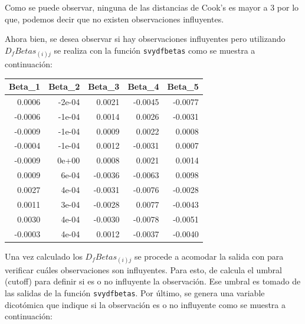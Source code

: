 \documentclass[
  spanish,
  12pt,
]{book}
\newenvironment{Shaded}{\begin{snugshade}}{\end{snugshade}}
\newcommand{\DataTypeTok}[1]{\textcolor[rgb]{0.13,0.29,0.53}{#1}}
\newcommand{\DecValTok}[1]{\textcolor[rgb]{0.00,0.00,0.81}{#1}}
\newcommand{\FunctionTok}[1]{\textcolor[rgb]{0.13,0.29,0.53}{\textbf{#1}}}
\newcommand{\NormalTok}[1]{#1}
\newcommand{\OtherTok}[1]{\textcolor[rgb]{0.56,0.35,0.01}{#1}}
\newcommand{\SpecialCharTok}[1]{\textcolor[rgb]{0.81,0.36,0.00}{\textbf{#1}}}
\newcommand{\StringTok}[1]{\textcolor[rgb]{0.31,0.60,0.02}{#1}}
\begin{document}
Como se puede observar, ninguna de las distancias de Cook's es mayor a 3 por lo que, podemos decir que no existen observaciones influyentes.

Ahora bien, se desea observar si hay observaciones influyentes pero utilizando \(D_{f}Betas_{\left(i\right)j}\) se realiza con la función \texttt{svydfbetas} como se muestra a continuación:

\begin{Shaded}
\end{Shaded}

\begin{tabular}{r|r|r|r|r}
\hline
Beta\_1 & Beta\_2 & Beta\_3 & Beta\_4 & Beta\_5\\
\hline
0.0006 & -2e-04 & 0.0021 & -0.0045 & -0.0077\\
\hline
-0.0006 & -1e-04 & 0.0014 & 0.0026 & -0.0031\\
\hline
-0.0009 & -1e-04 & 0.0009 & 0.0022 & 0.0008\\
\hline
-0.0004 & -1e-04 & 0.0012 & -0.0031 & 0.0007\\
\hline
-0.0009 & 0e+00 & 0.0008 & 0.0021 & 0.0014\\
\hline
0.0009 & 6e-04 & -0.0036 & -0.0063 & 0.0098\\
\hline
0.0027 & 4e-04 & -0.0031 & -0.0076 & -0.0028\\
\hline
0.0011 & 3e-04 & -0.0028 & 0.0077 & -0.0043\\
\hline
0.0030 & 4e-04 & -0.0030 & -0.0078 & -0.0051\\
\hline
-0.0003 & 4e-04 & 0.0012 & -0.0037 & -0.0040\\
\hline
\end{tabular}

Una vez calculado los \(D_{f}Betas_{\left(i\right)j}\) se procede a acomodar la salida con para verificar cuáles observaciones son influyentes. Para esto, de calcula el umbral (cutoff) para definir si es o no influyente la observación. Ese umbral es tomado de las salidas de la función \texttt{svydfbetas}. Por último, se genera una variable dicotómica que indique si la observación es o no influyente como se muestra a continuación:
\end{document}
